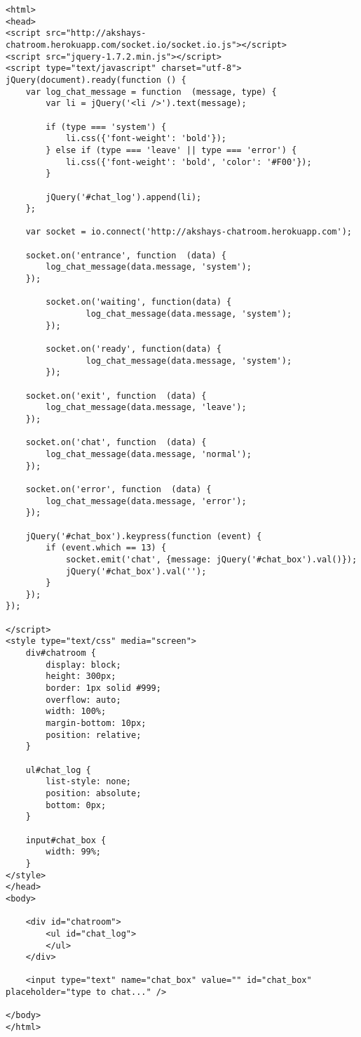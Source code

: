 \documentclass{article}
\begin{document}
\lstset{language=HTML}
\begin{lstlisting}
<html>
<head>
<script src="http://akshays-chatroom.herokuapp.com/socket.io/socket.io.js"></script>
<script src="jquery-1.7.2.min.js"></script>
<script type="text/javascript" charset="utf-8">
jQuery(document).ready(function () {
	var log_chat_message = function  (message, type) {
		var li = jQuery('<li />').text(message);
		
		if (type === 'system') {
			li.css({'font-weight': 'bold'});
		} else if (type === 'leave' || type === 'error') {
			li.css({'font-weight': 'bold', 'color': '#F00'});
		}
				
		jQuery('#chat_log').append(li);
	};

	var socket = io.connect('http://akshays-chatroom.herokuapp.com');

	socket.on('entrance', function  (data) {
		log_chat_message(data.message, 'system');
	});

        socket.on('waiting', function(data) {
                log_chat_message(data.message, 'system');
        });

        socket.on('ready', function(data) {
                log_chat_message(data.message, 'system');
        });

	socket.on('exit', function  (data) {
		log_chat_message(data.message, 'leave');
	});

	socket.on('chat', function  (data) {
		log_chat_message(data.message, 'normal');
	});

	socket.on('error', function  (data) {
		log_chat_message(data.message, 'error');
	});

	jQuery('#chat_box').keypress(function (event) {
		if (event.which == 13) {
			socket.emit('chat', {message: jQuery('#chat_box').val()});
			jQuery('#chat_box').val('');
		}
	});
});

</script>
<style type="text/css" media="screen">
	div#chatroom {
		display: block;
		height: 300px;
		border: 1px solid #999;
		overflow: auto;
		width: 100%;
		margin-bottom: 10px;
		position: relative;
	}

	ul#chat_log {
		list-style: none;
		position: absolute;
		bottom: 0px;
	}

	input#chat_box {
		width: 99%;
	}
</style>
</head>
<body>

	<div id="chatroom">
		<ul id="chat_log">
		</ul>
	</div>

	<input type="text" name="chat_box" value="" id="chat_box" placeholder="type to chat..." />

</body>
</html>

\end{lstlisting}
\end{document}
